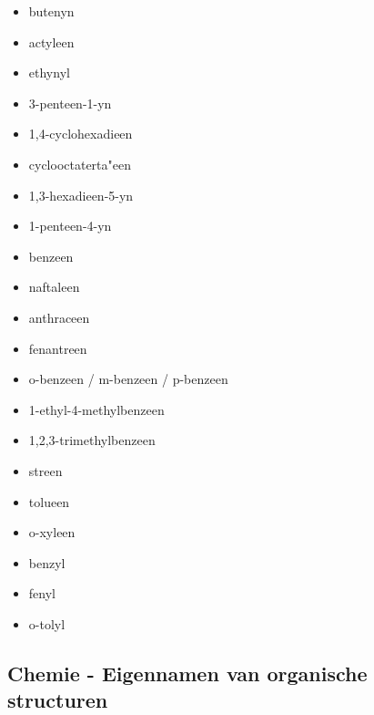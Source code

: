 \documentclass[a4paper,12pt]{article}
\begin{document}
\begin{enumerate}
\begin{itemize}
                \item butenyn
                \item actyleen
                \item ethynyl
                \item 3-penteen-1-yn                                                                                                                                                   
                \item 1,4-cyclohexadieen
                \item cyclooctaterta"een
                \item 1,3-hexadieen-5-yn
                \item 1-penteen-4-yn
                \item benzeen
                \item naftaleen
                \item anthraceen
                \item fenantreen
                \item o-benzeen / m-benzeen / p-benzeen
                \item 1-ethyl-4-methylbenzeen
                \item 1,2,3-trimethylbenzeen
                \item streen
                \item tolueen
                \item o-xyleen
                \item benzyl
                \item fenyl
                \item o-tolyl
            \end{itemize}
    \end{enumerate}

    \subsection{Chemie - Eigennamen van organische structuren}
\end{document}
